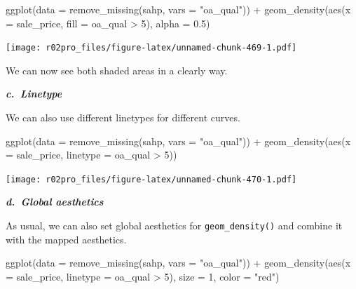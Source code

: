 \documentclass[
]{book}
\newenvironment{Shaded}{\begin{snugshade}}{\end{snugshade}}
\newcommand{\AttributeTok}[1]{\textcolor[rgb]{0.77,0.63,0.00}{#1}}
\newcommand{\DecValTok}[1]{\textcolor[rgb]{0.00,0.00,0.81}{#1}}
\newcommand{\FloatTok}[1]{\textcolor[rgb]{0.00,0.00,0.81}{#1}}
\newcommand{\FunctionTok}[1]{\textcolor[rgb]{0.00,0.00,0.00}{#1}}
\newcommand{\NormalTok}[1]{#1}
\newcommand{\SpecialCharTok}[1]{\textcolor[rgb]{0.00,0.00,0.00}{#1}}
\newcommand{\StringTok}[1]{\textcolor[rgb]{0.31,0.60,0.02}{#1}}
\begin{document}
\begin{Shaded}
\begin{Highlighting}[]
\FunctionTok{ggplot}\NormalTok{(}\AttributeTok{data =} \FunctionTok{remove\_missing}\NormalTok{(sahp, }\AttributeTok{vars =} \StringTok{"oa\_qual"}\NormalTok{)) }\SpecialCharTok{+}  \FunctionTok{geom\_density}\NormalTok{(}\FunctionTok{aes}\NormalTok{(}\AttributeTok{x =}\NormalTok{ sale\_price, }\AttributeTok{fill =}\NormalTok{ oa\_qual }\SpecialCharTok{\textgreater{}} \DecValTok{5}\NormalTok{), }\AttributeTok{alpha =} \FloatTok{0.5}\NormalTok{)}
\end{Highlighting}
\end{Shaded}

\texttt{[image: r02pro\_files/figure-latex/unnamed-chunk-469-1.pdf]}

We can now see both shaded areas in a clearly way.

\textbf{\emph{c.~Linetype}}

We can also use different linetypes for different curves.

\begin{Shaded}
\begin{Highlighting}[]
\FunctionTok{ggplot}\NormalTok{(}\AttributeTok{data =} \FunctionTok{remove\_missing}\NormalTok{(sahp, }\AttributeTok{vars =} \StringTok{"oa\_qual"}\NormalTok{)) }\SpecialCharTok{+}  \FunctionTok{geom\_density}\NormalTok{(}\FunctionTok{aes}\NormalTok{(}\AttributeTok{x =}\NormalTok{ sale\_price, }\AttributeTok{linetype =}\NormalTok{ oa\_qual }\SpecialCharTok{\textgreater{}} \DecValTok{5}\NormalTok{))}
\end{Highlighting}
\end{Shaded}

\texttt{[image: r02pro\_files/figure-latex/unnamed-chunk-470-1.pdf]}

\textbf{\emph{d.~Global aesthetics}}

As usual, we can also set global aesthetics for \texttt{geom\_density()} and combine it with the mapped aesthetics.

\begin{Shaded}
\begin{Highlighting}[]
\FunctionTok{ggplot}\NormalTok{(}\AttributeTok{data =} \FunctionTok{remove\_missing}\NormalTok{(sahp, }\AttributeTok{vars =} \StringTok{"oa\_qual"}\NormalTok{)) }\SpecialCharTok{+}  \FunctionTok{geom\_density}\NormalTok{(}\FunctionTok{aes}\NormalTok{(}\AttributeTok{x =}\NormalTok{ sale\_price, }\AttributeTok{linetype =}\NormalTok{ oa\_qual }\SpecialCharTok{\textgreater{}} \DecValTok{5}\NormalTok{), }\AttributeTok{size =} \DecValTok{1}\NormalTok{, }\AttributeTok{color =} \StringTok{"red"}\NormalTok{)}
\end{Highlighting}
\end{Shaded}
\end{document}
